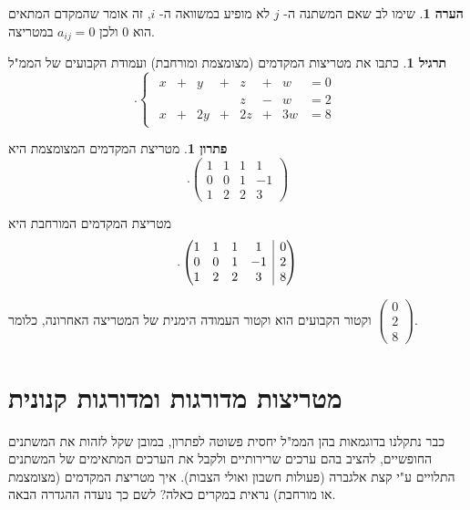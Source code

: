 \documentclass[12pt]{report}
\theoremstyle{plain}
\theoremstyle{definition}
\newtheorem{exercise}{תרגיל}[chapter]
\newtheorem{remark}{הערה}[chapter]
\newtheorem*{solution}{פתרון}
\newcommand{\0}{\mathbf{0}}
\begin{document}
\begin{remark}
שימו לב שאם המשתנה ה-
$j$
לא מופיע במשוואה ה-
$i$,
זה
אומר שהמקדם המתאים הוא
$0$
ולכן
$a_{ij}=0$
במטריצה.
\end{remark}

\begin{exercise}
כתבו את מטריצות המקדמים (מצומצמת ומורחבת) ועמודת הקבועים של הממ"ל
$$
.\begin{cases}
\begin{alignedat}{7}
 x &{}+{}&  y &{}+{}&  z &{}+{}&  w &=  0 \\[4pt]
    &     &     &     &  z &{}-{}&  w &=  2 \\[4pt]
 x &{}+{}& 2y &{}+{}& 2z &{}+{}& 3w &=  8
\end{alignedat}
\end{cases}
$$
\end{exercise}

\begin{solution}
מטריצת המקדמים המצומצמת היא
$$
.\begin{pmatrix}1 & 1 & 1 & 1\\
0 & 0 & 1 & -1\\
1 & 2 & 2 & 3
\end{pmatrix}
$$

מטריצת המקדמים המורחבת היא 
$$
.\left( \begin{array}{@{}cccc|c@{}}
	1 & 1 & 1 & 1 & 0\\
	0 & 0 & 1 & -1 & 2\\
	1 & 2 & 2 & 3 & 8
\end{array} \right)
$$

וקטור הקבועים הוא וקטור העמודה הימנית של המטריצה האחרונה, כלומר
$
\begin{pmatrix}
0 \\
2 \\
8
\end{pmatrix}
$.

\end{solution}

\section{מטריצות מדורגות ומדורגות קנונית}

כבר נתקלנו בדוגמאות בהן הממ"ל יחסית פשוטה לפתרון, במובן שקל לזהות את המשתנים החופשיים, להציב בהם ערכים שרירותיים ולקבל את הערכים המתאימים של המשתנים התלויים ע"י קצת אלגברה (פעולות חשבון ואולי הצבות). איך מטריצת המקדמים (מצומצמת או מורחבת) נראית במקרים כאלה? לשם כך נועדה ההגדרה הבאה.
\end{document}
